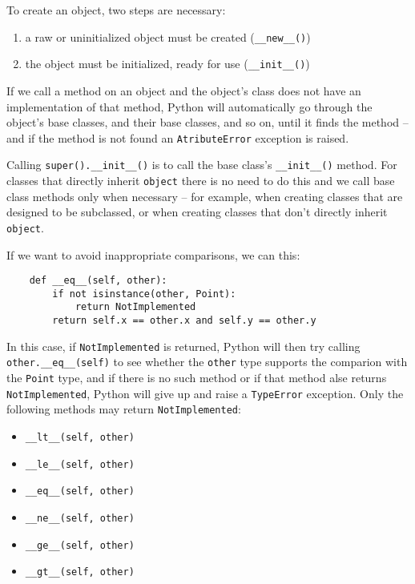 To create an object, two steps are necessary:
\begin{enumerate}
\item a raw or uninitialized object must be created (\verb|__new__()|)
\item the object must be initialized, ready for use (\verb|__init__()|)
\end{enumerate}



If we call a method on an object and the object's class does not have an implementation of that method,
Python will automatically go through the object's base classes, and their base classes, and so on, until it finds the method --
and if the method is not found an \verb|AtributeError| exception is raised.



Calling \verb|super().__init__()| is to call the base class's \verb|__init__()| method.
For classes that directly inherit \verb|object| there is no need to do this and we call base class methods only when necessary --
for example, when creating classes that are designed to be subclassed, or
when creating classes that don't directly inherit \verb|object|.



If we want to avoid inappropriate comparisons, we can this:
\begin{lstlisting}
    def __eq__(self, other):
        if not isinstance(other, Point):
            return NotImplemented
        return self.x == other.x and self.y == other.y
\end{lstlisting}
In this case, if \verb|NotImplemented| is returned, Python will then try calling \verb|other.__eq__(self)| to see
whether the \verb|other| type supports the comparion with the \verb|Point| type, and
if there is no such method or if that method alse returns \verb|NotImplemented|, Python will give up and
raise a \verb|TypeError| exception.
Only the following methods may return \verb|NotImplemented|:
\begin{itemize}
\item \verb|__lt__(self, other)|
\item \verb|__le__(self, other)|
\item \verb|__eq__(self, other)|
\item \verb|__ne__(self, other)|
\item \verb|__ge__(self, other)|
\item \verb|__gt__(self, other)|
\end{itemize}




